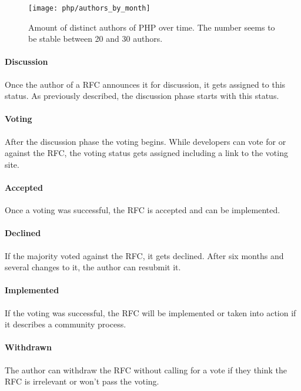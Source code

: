 \begin{figure}[htbp]
  \centering
  \texttt{[image: php/authors\_by\_month]}
  \caption[Authors by Month, PHP]
  {Amount of distinct authors of PHP over time. The number seems to be stable
    between 20 and 30 authors.}
  \label{fig:php:abm}
\end{figure}

\paragraph{Discussion}

Once the author of a \ac{RFC} announces it for discussion, it gets assigned to
this status. As previously described, the discussion phase starts with this
status.

\paragraph{Voting}

After the discussion phase the voting begins. While developers can vote for or
against the \ac{RFC}, the voting status gets assigned including a link to the
voting site.

\paragraph{Accepted}

Once a voting was successful, the \ac{RFC} is accepted and can be implemented.


\paragraph{Declined}

If the majority voted against the \ac{RFC}, it gets declined. After six months
and several changes to it, the author can resubmit it.

\paragraph{Implemented}

If the voting was successful, the \ac{RFC} will be implemented or taken into
action if it describes a community process.

\paragraph{Withdrawn}

The author can withdraw the \ac{RFC} without calling for a vote if they think
the \ac{RFC} is irrelevant or won't pass the voting.


